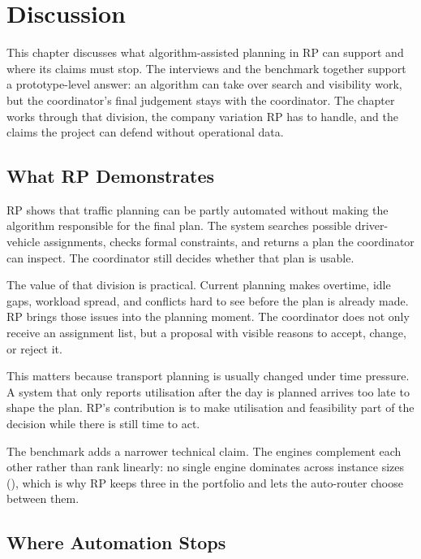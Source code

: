 \chapter{Discussion}
\label{chap:discussion}

This chapter discusses what algorithm-assisted planning in RP can support and where its claims must stop. The interviews and the benchmark together support a prototype-level answer: an algorithm can take over search and visibility work, but the coordinator's final judgement stays with the coordinator. The chapter works through that division, the company variation RP has to handle, and the claims the project can defend without operational data.


\section{What RP Demonstrates}
\label{sec:primary-findings}
\label{sec:efficiency}

RP shows that traffic planning can be partly automated without making the algorithm responsible for the final plan. The system searches possible driver-vehicle assignments, checks formal constraints, and returns a plan the coordinator can inspect. The coordinator still decides whether that plan is usable.

The value of that division is practical. Current planning makes overtime, idle gaps, workload spread, and conflicts hard to see before the plan is already made. RP brings those issues into the planning moment. The coordinator does not only receive an assignment list, but a proposal with visible reasons to accept, change, or reject it.

This matters because transport planning is usually changed under time pressure. A system that only reports utilisation after the day is planned arrives too late to shape the plan. RP's contribution is to make utilisation and feasibility part of the decision while there is still time to act.

The benchmark adds a narrower technical claim. The engines complement each other rather than rank linearly: no single engine dominates across instance sizes (), which is why RP keeps three in the portfolio and lets the auto-router choose between them.


\section{Where Automation Stops}
\label{sec:trust-control}

